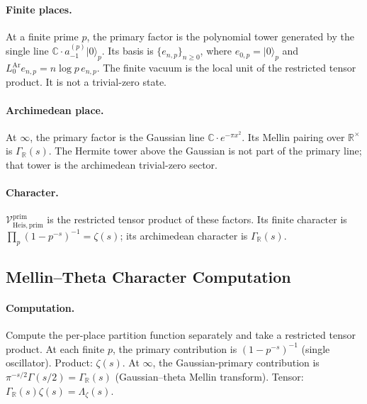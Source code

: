 \paragraph{Finite places.} At a finite prime \(p\), the primary factor
is the polynomial tower generated by the single line
\(\mathbb{C}\cdot a^{(p)}_{-1}|0\rangle_{p}\).  Its basis is
\(\{e_{n,p}\}_{n\geq0}\), where \(e_{0,p}=|0\rangle_{p}\) and
\(L_{0}^{\mathrm{Ar}}e_{n,p}=n\log p\,e_{n,p}\).  The finite vacuum is
the local unit of the restricted tensor product. It is not a
trivial-zero state.

\paragraph{Archimedean place.} At \(\infty\), the primary factor is
the Gaussian line \(\mathbb{C}\cdot e^{-\pi x^{2}}\).  Its Mellin
pairing over \(\mathbb{R}^{\times}\) is
\(\Gamma_{\mathbb R}(s)\).  The Hermite tower above the Gaussian is
not part of the primary line; that tower is the archimedean
trivial-zero sector.

\paragraph{Character.}
\(\mathcal{V}^{\mathrm{prim}}_{\mathrm{Heis},\mathrm{prim}}\) is
the restricted tensor product of these factors.  Its finite character
is \(\prod_{p}(1-p^{-s})^{-1}=\zeta(s)\); its archimedean character is
\(\Gamma_{\mathbb R}(s)\).

\subsection{Mellin--Theta Character Computation}
\label{v4-arith:prim-zeta:att-2-mellin}

\paragraph{Computation.} Compute the per-place partition function
separately and take a restricted tensor product. At each finite
\(p\), the primary contribution is \((1-p^{-s})^{-1}\) (single
oscillator). Product: \(\zeta(s)\). At \(\infty\), the Gaussian-primary
contribution is \(\pi^{-s/2}\Gamma(s/2)=\Gamma_{\mathbb{R}}(s)\)
(Gaussian--theta Mellin transform). Tensor:
\(\Gamma_{\mathbb{R}}(s)\zeta(s)=\Lambda_{\zeta}(s)\).

